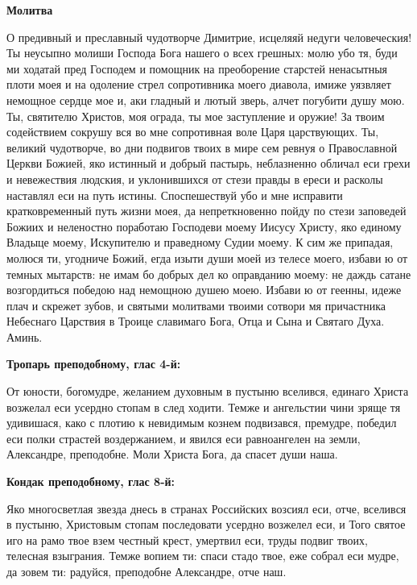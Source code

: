 \medskip
\bfseries Молитва\normalfont{}


О предивный и преславный чудотворче Димитрие, исцеляяй недуги человеческия! Ты неусыпно молиши Господа Бога нашего о всех грешных: молю убо тя, буди ми ходатай пред Господем и помощник на преоборение старстей ненасытныя плоти моея и на одоление стрел сопротивника моего диавола, имиже уязвляет немощное сердце мое и, аки гладный и лютый зверь, алчет погубити душу мою. Ты, святителю Христов, моя ограда, ты мое заступление и оружие! За твоим содействием сокрушу вся во мне сопротивная воле Царя царствующих. Ты, великий чудотворче, во дни подвигов твоих в мире сем ревнуя о Православной Церкви Божией, яко истинный и добрый пастырь, неблазненно обличал еси грехи и невежествия людския, и уклонившихся от стези правды в ереси и расколы наставлял еси на путь истины. Споспешествуй убо и мне исправити кратковременный путь жизни моея, да непреткновенно пойду по стези заповедей Божиих и неленостно поработаю Господеви моему Иисусу Христу, яко единому Владыце моему, Искупителю и праведному Судии моему. К сим же припадая, молюся ти, угодниче Божий, егда изыти души моей из телесе моего, избави ю от темных мытарств: не имам бо добрых дел ко оправданию моему: не даждь сатане возгордиться победою над немощною душею моею. Избави ю от геенны, идеже плач и скрежет зубов, и святыми молитвами твоими сотвори мя причастника Небеснаго Царствия в Троице славимаго Бога, Отца и Сына и Святаго Духа. Аминь.


\bigskip\bigskip\mychapterending

 
\bfseries Тропарь преподобному, глас 4-й:\normalfont{}


От юности, богомудре, желанием духовным в пустыню вселився, единаго Христа возжелал еси усердно стопам в след ходити. Темже и ангельстии чини зряще тя удивишася, како с плотию к невидимым кознем подвизався, премудре, победил еси полки страстей воздержанием, и явился еси равноангелен на земли, Александре, преподобне. Моли Христа Бога, да спасет души наша.


\medskip
\bfseries Кондак преподобному, глас 8-й:\normalfont{}


Яко многосветлая звезда днесь в странах Российских возсиял еси, отче, вселився в пустыню, Христовым стопам последовати усердно возжелел еси, и Того святое иго на рамо твое взем честный крест, умертвил еси, труды подвиг твоих, телесная взыграния. Темже вопием ти: спаси стадо твое, еже собрал еси мудре, да зовем ти: радуйся, преподобне Александре, отче наш.


